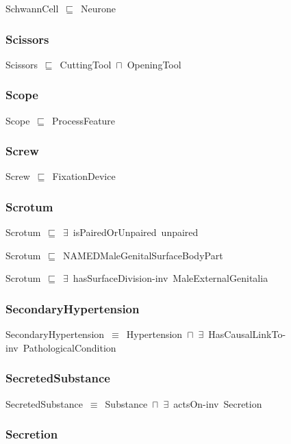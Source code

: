 \documentclass{article}
\begin{document}
SchwannCell~\ensuremath{\sqsubseteq}~Neurone~

\subsubsection*{Scissors}

Scissors~\ensuremath{\sqsubseteq}~CuttingTool~\ensuremath{\sqcap}~OpeningTool~

\subsubsection*{Scope}

Scope~\ensuremath{\sqsubseteq}~ProcessFeature~

\subsubsection*{Screw}

Screw~\ensuremath{\sqsubseteq}~FixationDevice~

\subsubsection*{Scrotum}

Scrotum~\ensuremath{\sqsubseteq}~\ensuremath{\exists}~isPairedOrUnpaired~unpaired~

Scrotum~\ensuremath{\sqsubseteq}~NAMEDMaleGenitalSurfaceBodyPart~

Scrotum~\ensuremath{\sqsubseteq}~\ensuremath{\exists}~hasSurfaceDivision-inv~MaleExternalGenitalia~

\subsubsection*{SecondaryHypertension}

SecondaryHypertension~\ensuremath{\equiv}~Hypertension~\ensuremath{\sqcap}~\ensuremath{\exists}~HasCausalLinkTo-inv~PathologicalCondition

\subsubsection*{SecretedSubstance}

SecretedSubstance~\ensuremath{\equiv}~Substance~\ensuremath{\sqcap}~\ensuremath{\exists}~actsOn-inv~Secretion

\subsubsection*{Secretion}
\end{document}
